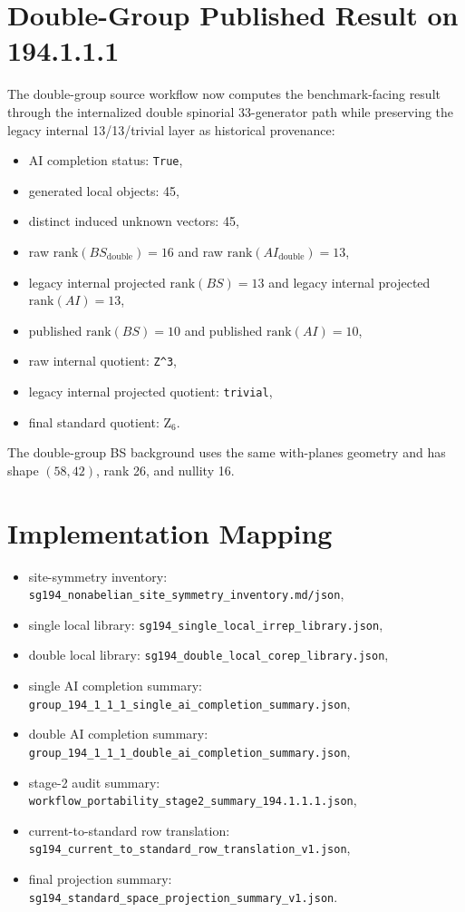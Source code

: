 \documentclass[11pt]{article}
\begin{document}
\section{Double-Group Published Result on 194.1.1.1}
The double-group source workflow now computes the benchmark-facing result through the internalized double spinorial 33-generator path while preserving the legacy internal 13/13/trivial layer as historical provenance:
\begin{itemize}
\item AI completion status: \texttt{True},
\item generated local objects: 45,
\item distinct induced unknown vectors: 45,
\item raw $\mathrm{rank}(BS_{\mathrm{double}}) = 16$ and raw $\mathrm{rank}(AI_{\mathrm{double}}) = 13$,
\item legacy internal projected $\mathrm{rank}(BS) = 13$ and legacy internal projected $\mathrm{rank}(AI) = 13$,
\item published $\mathrm{rank}(BS) = 10$ and published $\mathrm{rank}(AI) = 10$,
\item raw internal quotient: \texttt{Z\textasciicircum{}3},
\item legacy internal projected quotient: \texttt{trivial},
\item final standard quotient: $\mathrm{Z}_{6}$.
\end{itemize}
The double-group BS background uses the same with-planes geometry and has shape $(58,42)$, rank 26, and nullity 16.

\section{Implementation Mapping}
\begin{itemize}
\item site-symmetry inventory: \texttt{sg194\_nonabelian\_site\_symmetry\_inventory.md/json},
\item single local library: \texttt{sg194\_single\_local\_irrep\_library.json},
\item double local library: \texttt{sg194\_double\_local\_corep\_library.json},
\item single AI completion summary: \texttt{group\_194\_1\_1\_1\_single\_ai\_completion\_summary.json},
\item double AI completion summary: \texttt{group\_194\_1\_1\_1\_double\_ai\_completion\_summary.json},
\item stage-2 audit summary: \texttt{workflow\_portability\_stage2\_summary\_194.1.1.1.json},
\item current-to-standard row translation: \texttt{sg194\_current\_to\_standard\_row\_translation\_v1.json},
\item final projection summary: \texttt{sg194\_standard\_space\_projection\_summary\_v1.json}.
\end{itemize}
\end{document}
